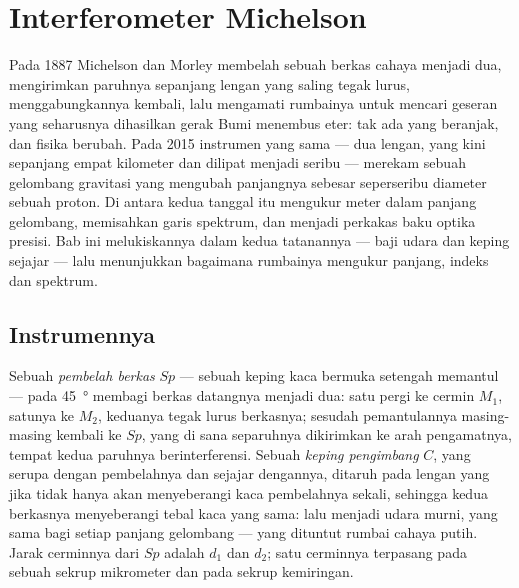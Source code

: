\chapter{Interferometer Michelson}\label{ch:b2:michelson}

Pada 1887 Michelson dan Morley membelah sebuah berkas cahaya menjadi dua, mengirimkan
paruhnya sepanjang lengan yang saling tegak lurus, menggabungkannya kembali, lalu mengamati
rumbainya untuk mencari geseran yang seharusnya dihasilkan gerak Bumi menembus eter:
tak ada yang beranjak, dan fisika berubah. Pada 2015 instrumen yang sama
--- dua lengan, yang kini sepanjang empat kilometer dan dilipat menjadi
seribu --- merekam sebuah gelombang gravitasi yang mengubah panjangnya
sebesar seperseribu diameter sebuah proton. Di antara kedua tanggal itu
 mengukur meter dalam panjang gelombang, memisahkan
garis spektrum, dan menjadi perkakas baku optika presisi.
Bab ini melukiskannya dalam kedua tatanannya --- baji udara
dan keping sejajar --- lalu menunjukkan bagaimana rumbainya mengukur panjang,
indeks dan spektrum.

\section{Instrumennya}

\begin{definition}\label{def:b2:michelson:instrument}
Sebuah \emph{pembelah berkas} $Sp$ --- sebuah keping kaca bermuka setengah memantul
--- pada \qty{45}{\degree} membagi berkas datangnya menjadi dua: satu pergi ke
cermin $M_1$, satunya ke $M_2$, keduanya tegak lurus berkasnya; sesudah
pemantulannya masing-masing kembali ke $Sp$, yang di sana separuhnya dikirimkan ke arah
pengamatnya, tempat kedua paruhnya berinterferensi. Sebuah \emph{keping pengimbang}
$C$, yang serupa dengan pembelahnya dan sejajar dengannya, ditaruh pada lengan
yang jika tidak hanya akan menyeberangi kaca pembelahnya sekali, sehingga kedua
berkasnya menyeberangi tebal kaca yang sama:  lalu menjadi
 udara murni, yang sama bagi setiap panjang gelombang --- yang
dituntut rumbai cahaya putih. Jarak cerminnya dari $Sp$ adalah $d_1$
dan $d_2$; satu cerminnya terpasang pada sebuah sekrup mikrometer dan pada sekrup
kemiringan.
\end{definition}

